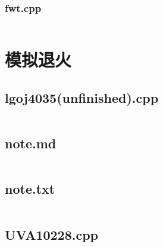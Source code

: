 \documentclass[a4paper,landscape,twocolumn]{article} %
\begin{document}
\subsubsection{fwt.cpp}
\inputminted{c++}{./codes/055}
\section{模拟退火}
\subsection{lgoj4035(unfinished).cpp}
\inputminted{c++}{./codes/056}
\subsection{note.md}
\inputminted{text}{./codes/057}
\subsection{note.txt}
\inputminted{text}{./codes/058}
\subsection{UVA10228.cpp}
\inputminted{c++}{./codes/059}
\end{document}
